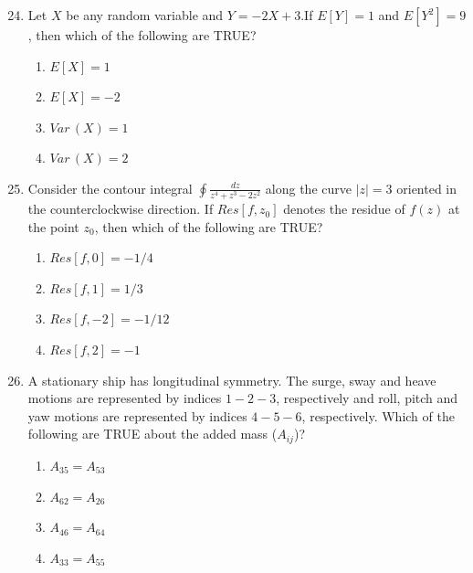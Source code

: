 \documentclass[journal]{IEEEtran}
\theoremstyle{remark}
\begin{document}
\begin{enumerate}[itemsep=1em]
\setcounter{enumi}{23}
\item Let $X$ be any random variable and $Y=-2X+3$.If $E[Y]=1$ and $E[Y^2]=9$, then which of the following are TRUE? 
\begin{multicols}{4}
\begin{enumerate}
    \item $E[X]=1$
    \item $E[X]=-2$
    \item $Var\,(X)=1$
    \item $Var\,(X)=2$
\end{enumerate}
\end{multicols}
\end{enumerate}

\begin{enumerate}[itemsep=1em]
\setcounter{enumi}{24}
\item Consider the contour integral $\oint \frac{dz}{z^4+z^3-2z^2}$  along the curve $|z| =3$ oriented in the counterclockwise direction. If $Res[f,z_0]$ denotes the residue of $f(z)$ at the point $z_0$,  then which of the following are TRUE? 

\begin{enumerate}[leftmargin=2.5em, labelsep=0.5em, itemsep=0.5em]
      \item $Res[f,0]=-1/4$
      \item $Res[f,1]=1/3$
      \item $Res[f,-2]=-1/12$
      \item $Res[f,2]=-1$
\end{enumerate}

\end{enumerate}

\newpage
\vspace*{0.25cm}

\begin{enumerate}[itemsep=1em]
\setcounter{enumi}{25}
\item A stationary ship has longitudinal symmetry. The surge, sway and heave motions are represented by indices $1-2-3$, respectively and roll, pitch and yaw motions are represented by indices $4-5-6$, respectively. Which of the following are TRUE 
about the added mass ($A_{ij}$)?
\begin{multicols}{4}
\begin{enumerate}
     \item $A_{35}=A_{53}$
     \item $A_{62}=A_{26}$
     \item $A_{46}=A_{64}$
     \item $A_{33}=A_{55}$
\end{enumerate}
\end{multicols}
\end{enumerate}
\end{document}
